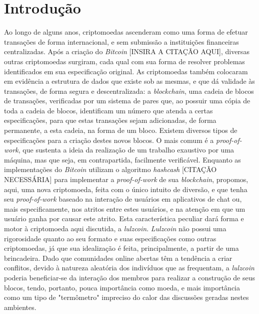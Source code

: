 \documentclass[conference]{IEEEtran}
\begin{document}
\IEEEpeerreviewmaketitle



\section{Introdução}
Ao longo de alguns anos, criptomoedas ascenderam como uma forma de efetuar transações de forma internacional, e sem submissão a instituições financeiras centralizadas. Após a criação do \textit{Bitcoin} [INSIRA A CITAÇÃO AQUI], diversas outras criptomoedas surgiram, cada qual com sua forma de resolver problemas identificados em sua especificação original.
As criptomoedas também colocaram em evidência a estrutura de dados que existe sob as mesmas, e que dá validade às transações, de forma segura e descentralizada: a \textit{blockchain}, uma cadeia de blocos de transações, verificadas por um sistema de pares que, ao possuir uma cópia de toda a cadeia de blocos, identificam um número que atenda a certas especificações, para que estas transações sejam adicionadas, de forma permanente, a esta cadeia, na forma de um bloco.
Existem diversos tipos de especificações para a criação destes novos blocos. O mais comum é a \textit{proof-of-work}, que sustenta a ideia da realização de um trabalho exaustivo por uma máquina, mas que seja, em contrapartida, facilmente verificável.
Enquanto as implementações do \textit{Bitcoin} utilizam o algoritmo \textit{hashcash} [CITAÇÃO NECESSÁRIA] para implementar a \textit{proof-of-work} de sua \textit{blockchain}, propomos, aqui, uma nova criptomoeda, feita com o único intuito de diversão, e que tenha seu \textit{proof-of-work} baseado na interação de usuários em aplicativos de chat ou, mais especificamente, nos atritos entre estes usuários, e na atenção em que um usuário ganha por causar este atrito. Esta característica peculiar dará forma e motor à criptomoeda aqui discutida, a \textit{lulzcoin}.
\textit{Lulzcoin} não possui uma rigorosidade quanto ao seu formato e suas especificações como outras criptomoedas, já que sua idealização é feita, principalmente, a partir de uma brincadeira. Dado que comunidades online abertas têm a tendência a criar conflitos, devido à natureza aleatória dos indivíduos que as frequentam, a \textit{lulzcoin} poderia beneficiar-se da interação dos membros para realizar a construção de seus blocos, tendo, portanto, pouca importância como moeda, e mais importância como um tipo de "termômetro" impreciso do calor das discussões geradas nestes ambientes.
\end{document}
